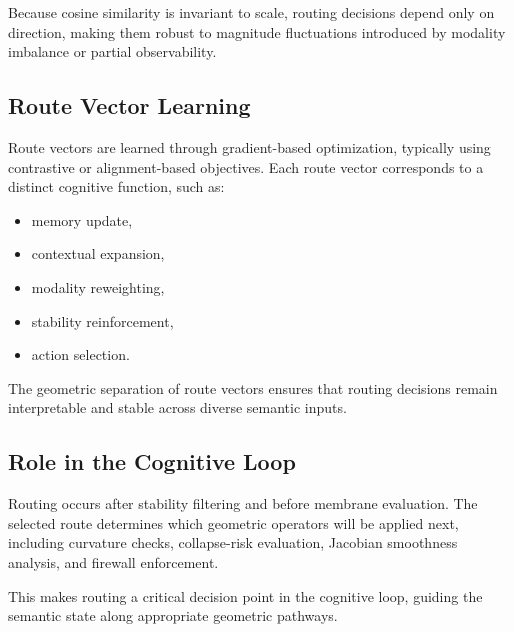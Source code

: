 Because cosine similarity is invariant to scale, routing decisions depend only
on direction, making them robust to magnitude fluctuations introduced by
modality imbalance or partial observability.

\subsection{Route Vector Learning}

Route vectors are learned through gradient-based optimization, typically using
contrastive or alignment-based objectives. Each route vector corresponds to a
distinct cognitive function, such as:

\begin{itemize}
\item memory update,
\item contextual expansion,
\item modality reweighting,
\item stability reinforcement,
\item action selection.
\end{itemize}

The geometric separation of route vectors ensures that routing decisions remain
interpretable and stable across diverse semantic inputs.

\subsection{Role in the Cognitive Loop}

Routing occurs after stability filtering and before membrane evaluation. The
selected route determines which geometric operators will be applied next,
including curvature checks, collapse-risk evaluation, Jacobian smoothness
analysis, and firewall enforcement.

This makes routing a critical decision point in the cognitive loop, guiding the
semantic state along appropriate geometric pathways.
